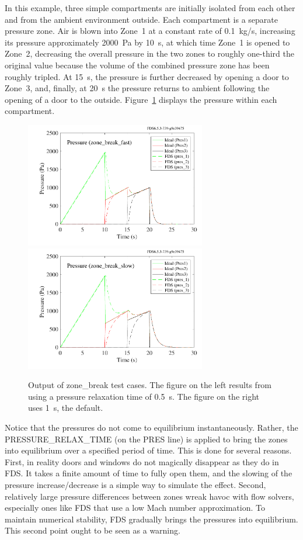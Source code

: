 \documentclass[11pt]{book}
\begin{document}
In this example, three simple compartments are initially isolated from each other and from the ambient environment outside. Each compartment is a separate pressure zone. Air is blown into Zone~1 at a constant rate of 0.1~kg/s, increasing its pressure approximately 2000~Pa by 10~s, at which time Zone~1 is opened to Zone~2, decreasing the overall pressure in the two zones to roughly one-third the original value because the volume of the combined pressure zone has been roughly tripled. At 15~s, the pressure is further decreased by opening a door to Zone~3, and, finally, at 20~s the pressure returns to ambient following the opening of a door to the outside. Figure~\ref{zone_break} displays the pressure within each compartment.
\begin{figure}[ht]
\includegraphics[width=3.1in]{SCRIPT_FIGURES/zone_break_fast}
\includegraphics[width=3.1in]{SCRIPT_FIGURES/zone_break_slow}
\caption[Results of the {\ct zone\_break} test cases]{Output of {\ct zone\_break} test cases. The figure on the left results from using a pressure relaxation time of 0.5~s. The
figure on the right uses 1~s, the default.}
\label{zone_break}
\end{figure}
Notice that the pressures do not come to equilibrium instantaneously. Rather, the {\ct PRESSURE\_RELAX\_TIME} (on the {\ct PRES} line) is applied to bring the zones
into equilibrium over a specified period of time. This is done for several reasons. First, in reality doors and windows do not magically disappear as they do in FDS. It takes
a finite amount of time to fully open them, and the slowing of the pressure increase/decrease is a simple way to simulate the effect.
Second, relatively large pressure differences between zones wreak havoc with flow solvers, especially ones like FDS that
use a low Mach number approximation. To maintain numerical stability, FDS gradually brings the pressures into equilibrium. This second point ought to be seen as a warning.
\end{document}
